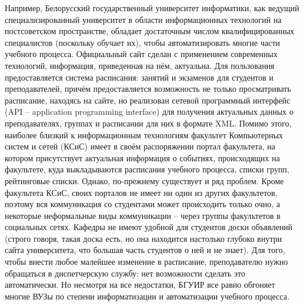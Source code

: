 Например, Белорусский государственный университет информатики, как ведущий специализированный университет в области информационных технологий на постсоветском пространстве, обладает достаточным числом квалифицированных специалистов (поскольку обучает их), чтобы автоматизировать многие части учебного процесса. Официальный сайт сделан с применением современных технологий, информация, приведенная на нём, актуальна. Для пользования предоставляется система расписания: занятий и экзаменов для студентов и преподавателей, причём предоставляется возможность не только просматривать расписание, находясь на сайте, но реализован сетевой программный интерфейс (API -- application programming interface) для получения актуальных данных о преподавателях, группах и расписании для них в формате XML. Помимо этого, наиболее близкий к информационным технологиям факультет Компьютерных систем и сетей (КСиС) имеет в своём распоряжении портал факультета, на котором присутствует актуальная информация о событиях, происходящих на факультете, куда выкладываются расписания учебного процесса, списки групп, рейтинговые списки. Однако, по-прежнему существует и ряд проблем. Кроме факультета КСиС, своих порталов не имеет ни один из других факультетов, поэтому вся коммуникация со студентами может происходить только очно, а некоторые неформальные виды коммуникации -- через группы факультетов в социальных сетях. Кафедры не имеют удобной для студентов доски объявлений (строго говоря, такая доска есть, но она находится настолько глубоко внутри сайта университета, что большая часть студентов о ней и не знает). Для того, чтобы внести любое малейшее изменение в расписание, преподавателю нужно обращаться в диспетчерскую службу: нет возможности сделать это автоматически. Но несмотря на все недостатки, БГУИР все равно обгоняет многие ВУЗы по степени информатизации и автоматизации учебного процесса.

